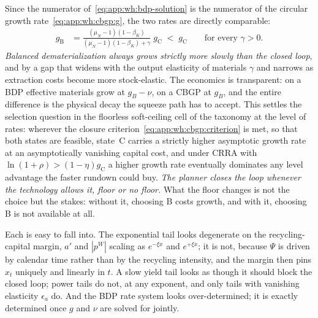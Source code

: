  Since the numerator of~\eqref{eq:app:wh:bdp-solution} is the numerator of the circular growth rate~\eqref{eq:app:wh:cbgp:g}, the two rates are directly comparable:
\begin{align}
g_{\mathrm{B}} &= \frac{\left(\mu_N-1\right)\left(1-\beta_K\right)}{\left(\mu_N-1\right)\left(1-\beta_K\right)+\gamma}\;g_{\mathrm{C}}
\;<\;g_{\mathrm{C}}
\qquad\text{for every }\gamma>0 .
\label{eq:app:wh:bdp-vs-c}
\end{align}
\emph{Balanced dematerialization always grows strictly more slowly than the closed loop}, and by a gap that widens with the output elasticity of materials $\gamma$ and narrows as extraction costs become more stock-elastic. The economics is transparent: on a BDP effective materials grow at $g_B-\nu$, on a CBGP at $g_B$, and the entire difference is the physical decay the squeeze path has to accept. This settles the selection question in the floorless soft-ceiling cell of the taxonomy at the level of rates: wherever the closure criterion~\eqref{eq:app:wh:cbgp:criterion} is met, so that both states are feasible, state~C carries a strictly higher asymptotic growth rate at an asymptotically vanishing capital cost, and under CRRA with $\ln\left(1+\rho\right)>\left(1-\eta\right)g_{\mathrm C}$ a higher growth rate eventually dominates any level advantage the faster rundown could buy. \emph{The planner closes the loop whenever the technology allows it, floor or no floor.} What the floor changes is not the choice but the stakes: without it, choosing B costs growth, and with it, choosing B is not available at all.

 Each is easy to fall into. The exponential tail looks degenerate on the recycling-capital margin, $a'$ and $\left|p^W\right|$ scaling as $e^{-\xi x}$ and $e^{+\xi x}$; it is not, because $\Psi$ is driven by calendar time rather than by the recycling intensity, and the margin then pins $x_t$ uniquely and linearly in $t$. A slow yield tail looks as though it should block the closed loop; power tails do not, at any exponent, and only tails with vanishing elasticity $\epsilon_a$ do. And the BDP rate system looks over-determined; it is exactly determined once $g$ and $\nu$ are solved for jointly.
